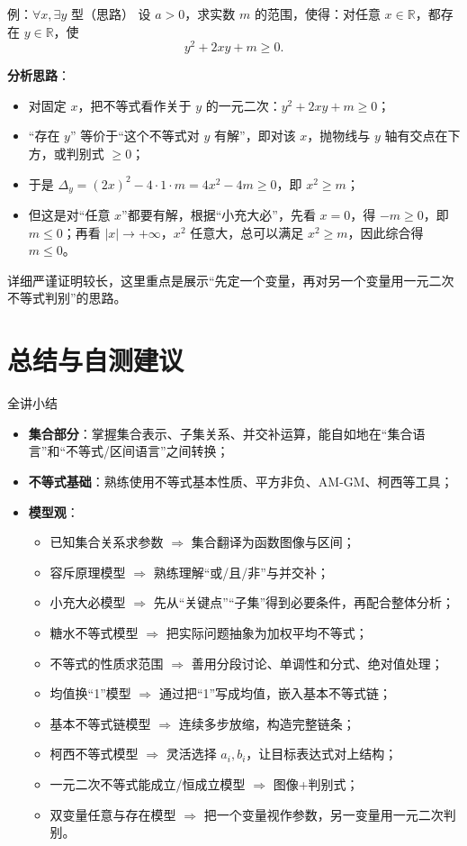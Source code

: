 \documentclass[a4paper,11pt]{ctexart}
\begin{document}
\begin{examplebox}{例：$\forall x,\exists y$ 型（思路）}
设 $a>0$，求实数 $m$ 的范围，使得：对任意 $x\in\mathbb{R}$，都存在 $y\in\mathbb{R}$，使
\[
y^2+2xy+m\ge 0.
\]

\textbf{分析思路}：
\begin{itemize}
  \item 对固定 $x$，把不等式看作关于 $y$ 的一元二次：$y^2+2xy+m\ge 0$；
  \item “存在 $y$” 等价于“这个不等式对 $y$ 有解”，即对该 $x$，抛物线与 $y$ 轴有交点在下方，或判别式 $\ge 0$；
  \item 于是 $\Delta_y=(2x)^2-4\cdot 1\cdot m=4x^2-4m\ge 0$，即 $x^2\ge m$；
  \item 但这是对“任意 $x$”都要有解，根据“小充大必”，先看 $x=0$，得 $-m\ge 0$，即 $m\le 0$；再看 $|x|\to +\infty$，$x^2$ 任意大，总可以满足 $x^2\ge m$，因此综合得 $m\le 0$。
\end{itemize}
详细严谨证明较长，这里重点是展示“先定一个变量，再对另一个变量用一元二次不等式判别”的思路。
\end{examplebox}

\section{总结与自测建议}

\begin{summarybox}[mathnote coverage=soft]{全讲小结}
\begin{itemize}
  \item \textbf{集合部分}：掌握集合表示、子集关系、并交补运算，能自如地在“集合语言”和“不等式/区间语言”之间转换；
  \item \textbf{不等式基础}：熟练使用不等式基本性质、平方非负、AM-GM、柯西等工具；
  \item \textbf{模型观}：
  \begin{itemize}
    \item 已知集合关系求参数 $\Rightarrow$ 集合翻译为函数图像与区间；
    \item 容斥原理模型 $\Rightarrow$ 熟练理解“或/且/非”与并交补；
    \item 小充大必模型 $\Rightarrow$ 先从“关键点”“子集”得到必要条件，再配合整体分析；
    \item 糖水不等式模型 $\Rightarrow$ 把实际问题抽象为加权平均不等式；
    \item 不等式的性质求范围 $\Rightarrow$ 善用分段讨论、单调性和分式、绝对值处理；
    \item 均值换“1”模型 $\Rightarrow$ 通过把“1”写成均值，嵌入基本不等式链；
    \item 基本不等式链模型 $\Rightarrow$ 连续多步放缩，构造完整链条；
    \item 柯西不等式模型 $\Rightarrow$ 灵活选择 $a_i,b_i$，让目标表达式对上结构；
    \item 一元二次不等式能成立/恒成立模型 $\Rightarrow$ 图像+判别式；
    \item 双变量任意与存在模型 $\Rightarrow$ 把一个变量视作参数，另一变量用一元二次判别。
  \end{itemize}
\end{itemize}
\end{summarybox}
\end{document}
